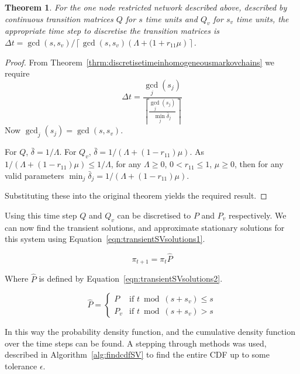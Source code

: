 \documentclass{article}
\newtheorem{theorem}{Theorem}
\begin{document}
\begin{theorem}
For the one node restricted network described above, described by continuous transition matrices $Q$ for $s$ time units and $Q_v$ for $s_v$ time units, the appropriate time step to discretise the transition matrices is $\Delta t = \gcd(s, s_v) / \left\lceil \gcd(s, s_v) \left(\Lambda + (1 + r_{11}\mu\right) \right\rceil$.
\end{theorem}

\begin{proof}
From Theorem~\ref{thrm:discretisetimeinhomogeneousmarkovchains} we require
\begin{equation*}
\Delta t = \frac{\gcd_j(s_j)}{\left\lceil \frac{\gcd_j(s_j)}{\min_j \bar{\delta}_j} \right\rceil}
\end{equation*}
Now $\gcd_j(s_j) = \gcd(s, s_v)$.

For $Q$, $\bar{\delta} = 1 / \Lambda$.
For $Q_v$, $\bar{\delta} = 1 /(\Lambda + (1 - r_{11})\mu)$.
As $1 /(\Lambda + (1 - r_{11})\mu) \leq 1 / \Lambda$, for any $\Lambda \geq 0$, $0 < r_{11} \leq 1$, $\mu \geq 0$, then for any valid parameters $\min_j \bar{\delta}_j = 1 /(\Lambda + (1 - r_{11})\mu)$.

Substituting these into the original theorem yields the required result.
\end{proof}

Using this time step $Q$ and $Q_v$ can be discretised to $P$ and $P_v$ respectively.
We can now find the transient solutions, and approximate stationary solutions for this system using Equation~\ref{eqn:transientSVsolutions1}.

\begin{equation}\label{eqn:transientSVsolutions1}
\pi_{t+1} = \pi_{t} \hat{P}
\end{equation}

Where $\hat{P}$ is defined by Equation~\ref{eqn:transientSVsolutions2}.

\begin{equation}\label{eqn:transientSVsolutions2}
\hat{P} = \left\{
    \begin{array}{cc}
    P & \text{if } t \bmod (s + s_v) \leq s \\
    P_v & \text{if } t \bmod (s + s_v) > s
    \end{array}\right.
\end{equation}

In this way the probability density function, and the cumulative density function over the time steps can be found.
A stepping through methods was used, described in Algorithm~\ref{alg:findcdfSV} to find the entire CDF up to some tolerance $\epsilon$.
\end{document}
